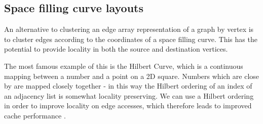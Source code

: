 \subsection{Space filling curve layouts}

An alternative to clustering an edge array representation of a graph by vertex is to cluster edges according to the coordinates of a space filling curve. This has the potential to provide locality in both the source and destination vertices.

The most famous example of this is the Hilbert Curve, which is a continuous mapping between a number and a point on a 2D square. Numbers which are close by are mapped closely together - in this way the Hilbert ordering of an index of an adjacency list is somewhat locality preserving. We can use a Hilbert ordering in order to improve locality on edge accesses, which therefore leads to improved cache performance \cite{189908}.

